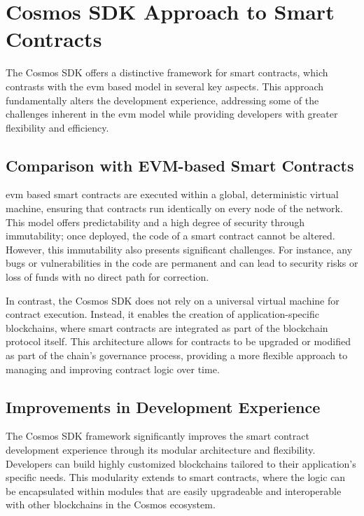 \section{Cosmos SDK Approach to Smart Contracts}
\label{sec:cosmos-sdk-smart-contracts}

The Cosmos SDK offers a distinctive framework for smart contracts, which contrasts with the \gls{evm} based model in several key aspects. This approach fundamentally alters the development experience, addressing some of the challenges inherent in the \gls{evm} model while providing developers with greater flexibility and efficiency.

\subsection{Comparison with EVM-based Smart Contracts}
\label{subsec:comparison-with-evm}

\gls{evm} based smart contracts are executed within a global, deterministic virtual machine, ensuring that contracts run identically on every node of the network. This model offers predictability and a high degree of security through immutability; once deployed, the code of a smart contract cannot be altered. However, this immutability also presents significant challenges. For instance, any bugs or vulnerabilities in the code are permanent and can lead to security risks or loss of funds with no direct path for correction.

In contrast, the Cosmos SDK does not rely on a universal virtual machine for contract execution. Instead, it enables the creation of application-specific blockchains, where smart contracts are integrated as part of the blockchain protocol itself. This architecture allows for contracts to be upgraded or modified as part of the chain's governance process, providing a more flexible approach to managing and improving contract logic over time.

\subsection{Improvements in Development Experience}
\label{subsec:improvements-in-development}

The Cosmos SDK framework significantly improves the smart contract development experience through its modular architecture and flexibility. Developers can build highly customized blockchains tailored to their application's specific needs. This modularity extends to smart contracts, where the logic can be encapsulated within modules that are easily upgradeable and interoperable with other blockchains in the Cosmos ecosystem.

